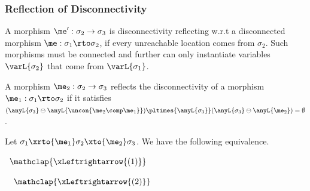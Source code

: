 
\subsubsection{Reflection of Disconnectivity}

A morphism $\me' : \sigma_2 \to \sigma_3$ is disconnectivity reflecting w.r.t a disconnected morphism $\me : \sigma_1 \rto \sigma_2$,
if every unreachable location comes from $\sigma_2$.
Such morphisms must be connected and further can only instantiate variables $\varL{\sigma_2}$ that come from $\varL{\sigma_1}$.

\begin{definition}
    A morphism $\me_2 : \sigma_2 \to \sigma_3$ reflects the disconnectivity of a morphism $\me_1 : \sigma_1 \rto \sigma_2$
    if it satisfies $(\anyL{\sigma_3} \ominus \anyL{\uncon{\me_2 \comp \me_1}}) \pltimes{\anyL{\sigma_3}} 
                     (\anyL{\sigma_3} \ominus \anyL{\me_2}) = \emptyset$.
\end{definition}

\begin{lemma}\label{lem:dcon-refl-prop-equiv}
    Let $\sigma_1 \xrto{\me_1} \sigma_2 \xto{\me_2} \sigma_3$.
    We have the following equivalence.

    $\hspace{5pt}\mathclap{\xLeftrightarrow{(1)}}$
    $\hspace{10pt}\mathclap{\xLeftrightarrow{(2)}}$

\end{lemma}

